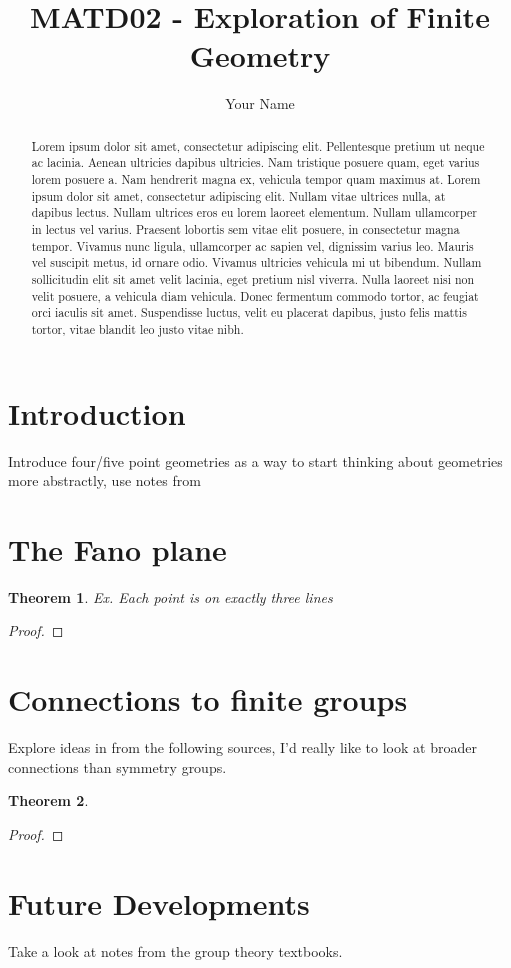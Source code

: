 \documentclass[12pt]{article}
\title{MATD02 - Exploration of Finite Geometry }
\author{Your Name}
\date{}
\newtheorem{theorem}{Theorem}
\begin{document}
    \maketitle

    \begin{abstract}
        Lorem ipsum dolor sit amet, consectetur adipiscing elit.
        Pellentesque pretium ut neque ac lacinia.
        Aenean ultricies dapibus ultricies.
        Nam tristique posuere quam, eget varius lorem posuere a.
        Nam hendrerit magna ex, vehicula tempor quam maximus at.
        Lorem ipsum dolor sit amet, consectetur adipiscing elit.
        Nullam vitae ultrices nulla, at dapibus lectus.
        Nullam ultrices eros eu lorem laoreet elementum.
        Nullam ullamcorper in lectus vel varius.
        Praesent lobortis sem vitae elit posuere, in consectetur magna tempor.
        Vivamus nunc ligula, ullamcorper ac sapien vel, dignissim varius leo.
        Mauris vel suscipit metus, id ornare odio.
        Vivamus ultricies vehicula mi ut bibendum.
        Nullam sollicitudin elit sit amet velit lacinia, eget pretium nisl viverra.
        Nulla laoreet nisi non velit posuere, a vehicula diam vehicula.
        Donec fermentum commodo tortor, ac feugiat orci iaculis sit amet.
        Suspendisse luctus, velit eu placerat dapibus, justo felis mattis tortor, vitae blandit leo justo vitae nibh.
    \end{abstract}


    \section{Introduction}

    Introduce four/five point geometries as a way to start thinking about geometries more abstractly, use notes from\cite{sinn_course_2021}

    \section{The Fano plane}

    \begin{theorem}
        Ex. Each point is on exactly three lines
    \end{theorem}

    \begin{proof}

    \end{proof}

    \section{Connections to finite groups}
    Explore ideas in from the following sources\cite{carmichael_finite_1930,tsuzuku_finite_1982},
    I'd really like to look at broader connections than symmetry groups.

    \begin{theorem}
    \end{theorem}

    \begin{proof}
    \end{proof}

    \section{Future Developments}

    Take a look at notes from the group theory textbooks.

    
    
\end{document}
